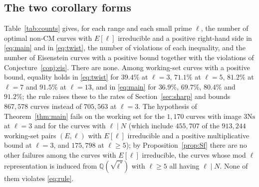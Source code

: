 \documentclass[11pt]{amsart}
\theoremstyle{definition}
\newcommand{\Q}{\mathbb{Q}}
\newcommand{\degphi}{\deg\varphi_E}
\newcommand{\Ns}{3\mathrm{Ns}}
\begin{document}
\begin{table}[ht]\centering\footnotesize

\caption{Working set, $\ell=3$: minimum of $v_3(\degphi)$ (number of curves) over curves with $E[3]$ irreducible whose only additive prime is a single $q\ge5$ of the given type with $e_3(E,q)=e$, and no multiplicative $3$-contribution. The same holds at $\ell=5$ and $7$.}\label{tab:iso}
\end{table}

\subsection{The two corollary forms}\label{sec:forms}
Table~\ref{tab:counts} gives, for each range and each small prime $\ell$, the number of optimal non-CM curves with $E[\ell]$ irreducible and a positive right-hand side in \eqref{eq:main} and in \eqref{eq:twist}, the number of violations of each inequality, and the number of Eisenstein curves with a positive bound together with the violations of Conjecture~\ref{conj:eis}. There are none. Among working-set curves with a positive bound, equality holds in \eqref{eq:twist} for $39.4\%$ at $\ell=3$, $71.1\%$ at $\ell=5$, $81.2\%$ at $\ell=7$ and $91.5\%$ at $\ell=13$, and in \eqref{eq:main} for $36.9\%$, $69.7\%$, $80.4\%$ and $91.2\%$; the rule raises these to the rates of Section~\ref{sec:sharp} and bounds $867{,}578$ curves instead of $705{,}563$ at $\ell=3$. The hypothesis of Theorem~\ref{thm:main} fails on the working set for the $1{,}170$ curves with image $\Ns$ at $\ell=3$ and for the curves with $\ell\mid N$ (which include $455{,}707$ of the $913{,}244$ working-set pairs $(E,\ell)$ with $E[\ell]$ irreducible and a positive multiplicative bound at $\ell=3$, and $175{,}798$ at $\ell\ge5$); by Proposition~\ref{prop:Sf} there are no other failures among the curves with $E[\ell]$ irreducible, the curves whose mod $\ell$ representation is induced from $\Q(\sqrt{\ell^*})$ with $\ell\ge5$ all having $\ell\mid N$. None of them violates \eqref{eq:rule}.

\begin{table}[ht]
\centering\footnotesize

\caption{Verification counts for the two corollary forms. ``\eqref{eq:main} $>0$'' is the number of curves with $E[\ell]$ irreducible, not CM, for which the right-hand side of \eqref{eq:main} is positive, and ``viol.'' the number of violations; likewise for \eqref{eq:twist}. The last column counts the Eisenstein curves with a positive bound in \eqref{eq:main} and the violations of Conjecture~\ref{conj:eis}.}\label{tab:counts}
\end{table}
\end{document}
